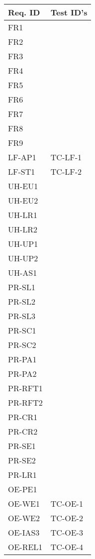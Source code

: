 \documentclass[12pt, titlepage]{article}
\begin{document}
\begin{enumerate}
    \begin{longtable}{|l|l|}
      \hline
      \textbf{Req. ID} & \textbf{Test ID's} \\
      \hline
      FR1 & \\ \hline
      FR2 & \\ \hline
      FR3 & \\ \hline
      FR4 & \\ \hline
      FR5 & \\ \hline
      FR6 & \\ \hline
      FR7 & \\ \hline
      FR8 & \\ \hline
      FR9 & \\ \hline
      LF-AP1 & TC-LF-1 \\ \hline
      LF-ST1 & TC-LF-2 \\ \hline
      UH-EU1 & \\ \hline
      UH-EU2 & \\ \hline
      UH-LR1 & \\ \hline
      UH-LR2 & \\ \hline
      UH-UP1 & \\ \hline
      UH-UP2 & \\ \hline
      UH-AS1 & \\ \hline
      PR-SL1 & \\ \hline
      PR-SL2 & \\ \hline
      PR-SL3 & \\ \hline
      PR-SC1 & \\ \hline
      PR-SC2 & \\ \hline
      PR-PA1 & \\ \hline
      PR-PA2 & \\ \hline
      PR-RFT1 & \\ \hline
      PR-RFT2 & \\ \hline
      PR-CR1 & \\ \hline
      PR-CR2 & \\ \hline
      PR-SE1 & \\ \hline
      PR-SE2 & \\ \hline
      PR-LR1 & \\ \hline
      OE-PE1 & \\ \hline
      OE-WE1 & TC-OE-1 \\ \hline
      OE-WE2 & TC-OE-2 \\ \hline
      OE-IAS3 & TC-OE-3 \\ \hline
      OE-REL1 & TC-OE-4 \\ \hline

\end{longtable}
\end{enumerate}
\end{document}
